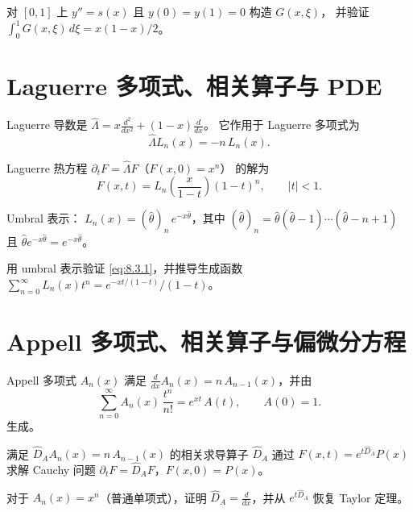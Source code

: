 \begin{exercise}
对 $[0,1]$ 上 $y''=s(x)$ 且 $y(0)=y(1)=0$ 构造 $G(x,\xi)$，
并验证 $\int_0^1 G(x,\xi)\,d\xi = x(1-x)/2$。
\end{exercise}

\section{Laguerre 多项式、相关算子与 PDE}

Laguerre 导数是
$\hat\Lambda = x\frac{d^2}{dx^2}+(1-x)\frac{d}{dx}$。
它作用于 Laguerre 多项式为
\begin{equation}
\hat\Lambda L_n(x) = -n\,L_n(x).
\label{eq:8.3.1}
\end{equation}

Laguerre 热方程
$\partial_t F = \hat\Lambda F$（$F(x,0)=x^n$）
的解为
\begin{equation}
F(x,t) = L_n\!\left(\frac{x}{1-t}\right)(1-t)^n,
\qquad |t|<1.
\label{eq:8.3.2}
\end{equation}

Umbral 表示：
$L_n(x)=(\hat\theta)_n\,e^{-x\hat\theta}$，其中
$(\hat\theta)_n=\hat\theta(\hat\theta-1)\cdots(\hat\theta-n+1)$
且 $\hat\theta e^{-x\hat\theta}=e^{-x\hat\theta}$。

\begin{exercise}
用 umbral 表示验证 \eqref{eq:8.3.1}，并推导生成函数
$\sum_{n=0}^\infty L_n(x)t^n = e^{-xt/(1-t)}/(1-t)$。
\end{exercise}

\section{Appell 多项式、相关算子与偏微分方程}

Appell 多项式 $A_n(x)$ 满足
$\frac{d}{dx}A_n(x)=n\,A_{n-1}(x)$，并由
\begin{equation}
\sum_{n=0}^{\infty} A_n(x)\,\frac{t^n}{n!}=e^{x t}\,A(t),
\qquad A(0)=1.
\label{eq:8.4.1}
\end{equation}
生成。

满足 $\hat D_A A_n(x)=n\,A_{n-1}(x)$ 的相关求导算子 $\hat D_A$ 通过
$F(x,t)=e^{t\hat D_A}P(x)$ 求解 Cauchy 问题
$\partial_t F=\hat D_A F$，$F(x,0)=P(x)$。

\begin{exercise}
对于 $A_n(x)=x^n$（普通单项式），证明
$\hat D_A=\frac{d}{dx}$，并从 $e^{t\hat D_A}$ 恢复 Taylor 定理。
\end{exercise}

